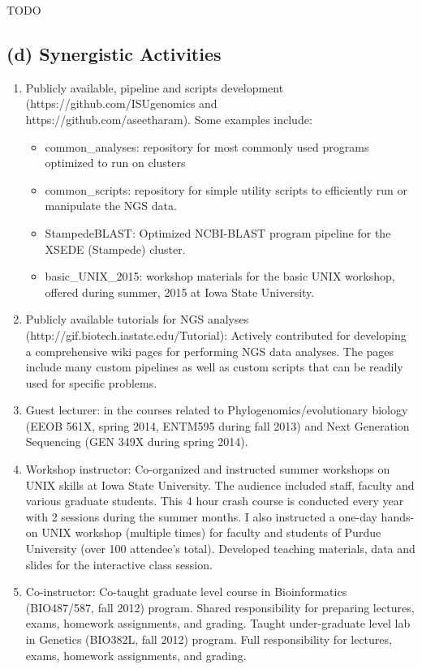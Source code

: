\documentclass[svgnames,11pt]{article}
\begin{document}
TODO 








\subsection*{(d) Synergistic Activities}
\begin{enumerate}
\item Publicly available, pipeline and scripts development (https://github.com/ISUgenomics and \\
https://github.com/aseetharam). Some examples include:
\begin{itemize}
\item common\_analyses: repository for most commonly used programs optimized to run on clusters
\item common\_scripts: repository for simple utility scripts to efficiently run or manipulate the NGS data.
\item StampedeBLAST: Optimized NCBI-BLAST program pipeline for the XSEDE (Stampede) cluster.
\item basic\_UNIX\_2015: workshop materials for the basic UNIX workshop, offered during summer, 2015 at Iowa State University.
\end{itemize}
\item Publicly available tutorials for NGS analyses (http://gif.biotech.iastate.edu/Tutorial): Actively contributed for developing a comprehensive wiki pages for performing NGS data analyses. The pages include many custom pipelines as well as custom scripts that can be readily used for specific problems.

\item Guest lecturer: in the courses related to Phylogenomics/evolutionary biology (EEOB 561X, spring 2014, ENTM595 during fall 2013) and Next Generation Sequencing (GEN 349X during spring 2014). 

\item Workshop instructor: Co-organized and instructed summer workshops on UNIX skills at Iowa State University. The audience included staff, faculty and various graduate students. This 4 hour crash course is conducted every year with 2 sessions during the summer months. I also instructed a one-day hands-on UNIX workshop (multiple times) for faculty and students of Purdue University (over 100 attendee's total). Developed teaching materials, data and slides for the interactive class session.

\item Co-instructor: Co-taught graduate level course in Bioinformatics (BIO487/587, fall 2012) program. Shared responsibility for preparing lectures, exams, homework assignments, and grading. Taught under-graduate level lab in Genetics (BIO382L, fall 2012) program. Full responsibility for lectures, exams, homework assignments, and grading.
\end{enumerate}
\end{document}
